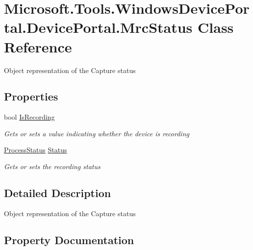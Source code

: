 \hypertarget{class_microsoft_1_1_tools_1_1_windows_device_portal_1_1_device_portal_1_1_mrc_status}{}\section{Microsoft.\+Tools.\+Windows\+Device\+Portal.\+Device\+Portal.\+Mrc\+Status Class Reference}
\label{class_microsoft_1_1_tools_1_1_windows_device_portal_1_1_device_portal_1_1_mrc_status}


Object representation of the Capture status  


\subsection*{Properties}
\begin{DoxyCompactItemize}
\item 
bool \hyperlink{class_microsoft_1_1_tools_1_1_windows_device_portal_1_1_device_portal_1_1_mrc_status_a81d8fa18ebdf97d8592d8e0858ee881a}{Is\+Recording}
\begin{DoxyCompactList}\small\item\em Gets or sets a value indicating whether the device is recording \end{DoxyCompactList}\item 
\hyperlink{class_microsoft_1_1_tools_1_1_windows_device_portal_1_1_device_portal_1_1_process_status}{Process\+Status} \hyperlink{class_microsoft_1_1_tools_1_1_windows_device_portal_1_1_device_portal_1_1_mrc_status_a1a5cc4c48bb6682f9182afe606c22df7}{Status}
\begin{DoxyCompactList}\small\item\em Gets or sets the recording status \end{DoxyCompactList}\end{DoxyCompactItemize}


\subsection{Detailed Description}
Object representation of the Capture status 



\subsection{Property Documentation}
